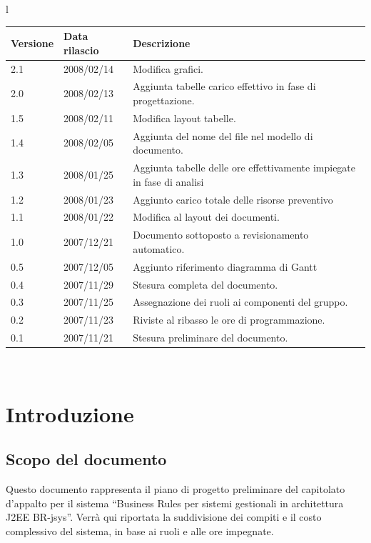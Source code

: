 \documentclass[11pt,titlepage,a4paper]{report}
\begin{document}
\begin{center}
\begin{table}[hbtp]
{\begin{tabular}{l}
\begin{tabular}{||p{2cm}||p{3.5cm}||p{6cm}||} \hline
\textbf{Versione} & \textbf{Data rilascio} & \textbf{Descrizione} \\ \hline
2.1 & 2008/02/14 & Modifica grafici.\\ \hline
2.0 & 2008/02/13 & Aggiunta tabelle carico effettivo in fase di progettazione.\\ \hline
1.5 & 2008/02/11 & Modifica layout tabelle.\\ \hline 
1.4 & 2008/02/05 & Aggiunta del nome del file nel modello di documento.\\ \hline
1.3 & 2008/01/25 & Aggiunta tabelle delle ore effettivamente impiegate in fase di analisi \\ \hline
1.2 & 2008/01/23 & Aggiunto carico totale delle risorse preventivo \\ \hline
1.1 & 2008/01/22 & Modifica al layout dei documenti.\\ \hline
1.0 & 2007/12/21 & Documento sottoposto a revisionamento automatico.\\ \hline
0.5 & 2007/12/05 & Aggiunto riferimento diagramma di Gantt \\ \hline
0.4 & 2007/11/29 & Stesura completa del documento. \\ \hline
0.3 & 2007/11/25 & Assegnazione dei ruoli ai componenti del gruppo. \\ \hline
0.2 & 2007/11/23 & Riviste al ribasso le ore di programmazione. \\ \hline
0.1 & 2007/11/21 & Stesura preliminare del documento. \\ \hline


\end{tabular} \\
\end{tabular}

}
\end{table}
\end{center}


\tableofcontents 


\chapter{Introduzione}
\section{Scopo del documento}
Questo documento rappresenta il piano di progetto preliminare del capitolato d'appalto per il sistema ``Business Rules per sistemi gestionali in architettura J2EE BR-jsys''. Verr\`a qui riportata la suddivisione dei compiti e il costo complessivo del sistema, in base ai ruoli e alle ore impegnate.
\end{document}
